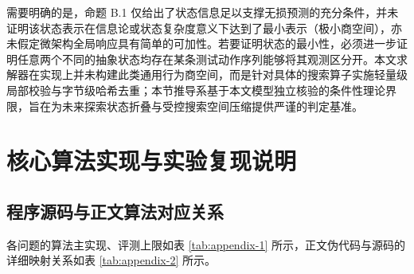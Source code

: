 \documentclass[anonymous,withtoc]{gmcm2026}
\begin{document}
需要明确的是，命题 B.1 仅给出了状态信息足以支撑无损预测的充分条件，并未证明该状态表示在信息论或状态复杂度意义下达到了最小表示（极小商空间），亦未假定微架构全局响应具有简单的可加性。若要证明状态的最小性，必须进一步证明任意两个不同的抽象状态均存在某条测试动作序列能够将其观测区分开。本文求解器在实现上并未构建此类通用行为商空间，而是针对具体的搜索算子实施轻量级局部校验与字节级哈希去重；本节推导系基于本文模型独立核验的条件性理论界限，旨在为未来探索状态折叠与受控搜索空间压缩提供严谨的判定基准。

\section{核心算法实现与实验复现说明}

\subsection{程序源码与正文算法对应关系}

各问题的算法主实现、评测上限如表 \ref{tab:appendix-1} 所示，正文伪代码与源码的详细映射关系如表 \ref{tab:appendix-2} 所示。
\end{document}
